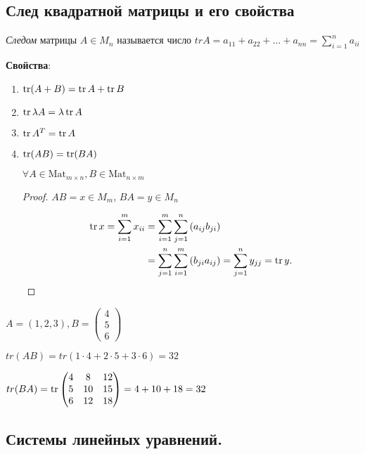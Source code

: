 \subsection{След квадратной матрицы и его свойства}
\begin{definition}
    \textit{Следом} матрицы $A \in M_n$ называется число $trA = a_{11} + a_{22} + \dots + a_{nn} = \sum_{i=1}^n a_{ii}$ 
\end{definition}

\textbf{Свойства}:
\begin{enumerate}
\item $\operatorname{\mathop{\mathrm{tr}}}(A + B) = \operatorname{\mathop{\mathrm{tr}}} A + \operatorname{\mathop{\mathrm{tr}}} B$
\item $\operatorname{\mathop{\mathrm{tr}}} \lambda A = \lambda \operatorname{\mathop{\mathrm{tr}}} A$
\item $\operatorname{\mathop{\mathrm{tr}}} A^T = \operatorname{\mathop{\mathrm{tr}}} A$
\item $\operatorname{\mathop{\mathrm{tr}}}(AB) = \operatorname{\mathop{\mathrm{tr}}}(BA)$

    $\forall A \in \text{Mat}_{m \times n}, B \in \text{Mat}_{n \times m}$

    \begin{proof}
        $AB = x \in M_m$, $BA = y \in M_n$

        \begin{align*}
            \operatorname{\mathop{\mathrm{tr}}} x 
            = \sum_{i = 1}^{m} x_{ii} 
            &= \sum_{i = 1}^{m} \sum_{j = 1}^{n} \left(a_{ij} b_{ji}\right) \\
            &= \sum_{j = 1}^{n} \sum_{i = 1}^{m} \left(b_{ji} a_{ij}\right) 
            = \sum_{j = 1}^{n} y_{jj} 
            = \operatorname{\mathop{\mathrm{tr}}} y
        .\end{align*}
    \end{proof}
\end{enumerate}

\begin{example}
    $A = (1, 2, 3), B = \begin{pmatrix}4 \\ 5 \\ 6\end{pmatrix}$

    $tr(AB) = tr(1 \cdot 4 + 2 \cdot 5 + 3 \cdot 6) = 32$

    $tr(BA) = \operatorname{\mathop{\mathrm{tr}}} \begin{pmatrix} 4 & 8 & 12 \\ 5 & 10 & 15 \\ 6 & 12 & 18 \end{pmatrix} = 4 + 10 + 18 = 32$
\end{example}


\subsection{Системы линейных уравнений.}

